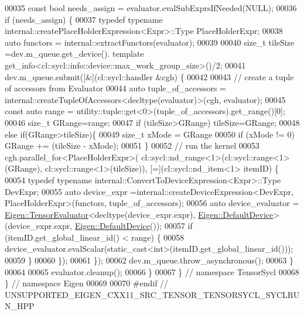 \begin{DoxyCode}
00035   \textcolor{keyword}{const} \textcolor{keywordtype}{bool} needs\_assign = evaluator.evalSubExprsIfNeeded(NULL);
00036   \textcolor{keywordflow}{if} (needs\_assign) \{
00037     \textcolor{keyword}{typedef}  \textcolor{keyword}{typename} internal::createPlaceHolderExpression<Expr>::Type PlaceHolderExpr;
00038     \textcolor{keyword}{auto} functors = internal::extractFunctors(evaluator);
00039 
00040     \textcolor{keywordtype}{size\_t} tileSize =dev.m\_queue.get\_device(). \textcolor{keyword}{template} 
      get\_info<cl::sycl::info::device::max\_work\_group\_size>()/2;
00041     dev.m\_queue.submit([&](cl::sycl::handler &cgh) \{
00042 
00043       \textcolor{comment}{// create a tuple of accessors from Evaluator}
00044       \textcolor{keyword}{auto} tuple\_of\_accessors = internal::createTupleOfAccessors<decltype(evaluator)>(cgh, evaluator);
00045       \textcolor{keyword}{const} \textcolor{keyword}{auto} range = utility::tuple::get<0>(tuple\_of\_accessors).get\_range()[0];
00046       \textcolor{keywordtype}{size\_t} GRange=range;
00047       \textcolor{keywordflow}{if} (tileSize>GRange) tileSize=GRange;
00048       \textcolor{keywordflow}{else} \textcolor{keywordflow}{if}(GRange>tileSize)\{
00049         \textcolor{keywordtype}{size\_t} xMode = GRange %
00050         \textcolor{keywordflow}{if} (xMode != 0) GRange += (tileSize - xMode);
00051       \}
00052       \textcolor{comment}{// run the kernel}
00053       cgh.parallel\_for<PlaceHolderExpr>( cl::sycl::nd\_range<1>(cl::sycl::range<1>(GRange), 
      cl::sycl::range<1>(tileSize)), [=](cl::sycl::nd\_item<1> itemID) \{
00054         \textcolor{keyword}{typedef}  \textcolor{keyword}{typename} internal::ConvertToDeviceExpression<Expr>::Type DevExpr;
00055         \textcolor{keyword}{auto} device\_expr =internal::createDeviceExpression<DevExpr, PlaceHolderExpr>(functors, 
      tuple\_of\_accessors);
00056         \textcolor{keyword}{auto} device\_evaluator = \hyperlink{struct_eigen_1_1_tensor_evaluator}{Eigen::TensorEvaluator}<decltype(device\_expr.expr), 
      \hyperlink{struct_eigen_1_1_default_device}{Eigen::DefaultDevice}>(device\_expr.expr, \hyperlink{struct_eigen_1_1_default_device}{Eigen::DefaultDevice}());
00057         \textcolor{keywordflow}{if} (itemID.get\_global\_linear\_id() < range) \{
00058           device\_evaluator.evalScalar(static\_cast<int>(itemID.get\_global\_linear\_id()));
00059         \}
00060       \});
00061     \});
00062     dev.m\_queue.throw\_asynchronous();
00063   \}
00064 
00065   evaluator.cleanup();
00066 \}
00067 \}  \textcolor{comment}{// namespace TensorSycl}
00068 \}  \textcolor{comment}{// namespace Eigen}
00069 
00070 \textcolor{preprocessor}{#endif  // UNSUPPORTED\_EIGEN\_CXX11\_SRC\_TENSOR\_TENSORSYCL\_SYCLRUN\_HPP}
\end{DoxyCode}

